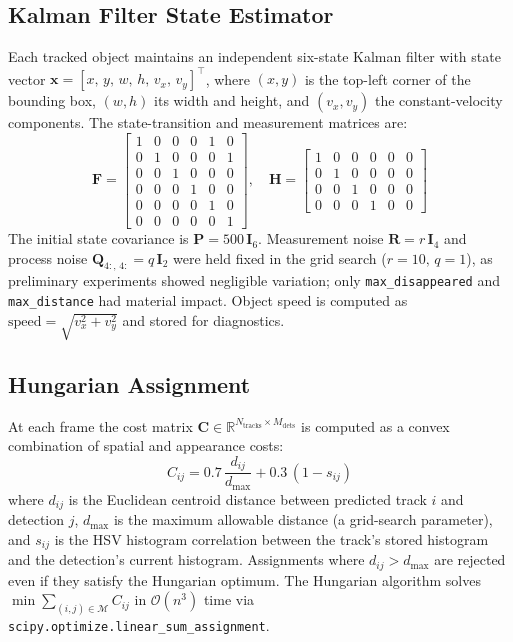 \documentclass[10pt, conference, compsocconf]{IEEEtran}
\begin{document}
\subsection{Kalman Filter State Estimator}
Each tracked object maintains an independent six-state Kalman
filter with state vector
$\mathbf{x} = [x,\, y,\, w,\, h,\, v_x,\, v_y]^\top$,
where $(x,y)$ is the top-left corner of the bounding box,
$(w,h)$ its width and height, and $(v_x, v_y)$ the constant-velocity
components. The state-transition and measurement matrices are:
\begin{equation}
  \mathbf{F} =
  \begin{bmatrix}
    1 & 0 & 0 & 0 & 1 & 0 \\
    0 & 1 & 0 & 0 & 0 & 1 \\
    0 & 0 & 1 & 0 & 0 & 0 \\
    0 & 0 & 0 & 1 & 0 & 0 \\
    0 & 0 & 0 & 0 & 1 & 0 \\
    0 & 0 & 0 & 0 & 0 & 1
  \end{bmatrix},\quad
  \mathbf{H} =
  \begin{bmatrix}
    1 & 0 & 0 & 0 & 0 & 0 \\
    0 & 1 & 0 & 0 & 0 & 0 \\
    0 & 0 & 1 & 0 & 0 & 0 \\
    0 & 0 & 0 & 1 & 0 & 0
  \end{bmatrix}
\end{equation}
The initial state covariance is $\mathbf{P} = 500\,\mathbf{I}_6$.
Measurement noise $\mathbf{R} = r\,\mathbf{I}_4$ and process noise
$\mathbf{Q}_{4:,\,4:} = q\,\mathbf{I}_2$ were held fixed in the grid
search ($r=10,\,q=1$), as preliminary experiments showed negligible
variation; only \texttt{max\_disappeared} and \texttt{max\_distance}
had material impact. Object speed is computed as
$\text{speed} = \sqrt{v_x^2 + v_y^2}$ and stored for diagnostics.

\subsection{Hungarian Assignment}
At each frame the cost matrix
$\mathbf{C} \in \mathbb{R}^{N_\text{tracks}\times M_\text{dets}}$
is computed as a convex combination of spatial and appearance costs:
\begin{equation}
  C_{ij} = 0.7\,\frac{d_{ij}}{d_\text{max}} + 0.3\,(1 - s_{ij})
  \label{eq:cost}
\end{equation}
where $d_{ij}$ is the Euclidean centroid distance between predicted
track $i$ and detection $j$, $d_\text{max}$ is the maximum allowable
distance (a grid-search parameter), and $s_{ij}$ is the HSV
histogram correlation between the track's stored histogram and the
detection's current histogram. Assignments where
$d_{ij} > d_\text{max}$ are rejected even if they satisfy the
Hungarian optimum. The Hungarian algorithm
\cite{kuhn1955} solves $\min \sum_{(i,j)\in\mathcal{M}} C_{ij}$
in $\mathcal{O}(n^3)$ time via \texttt{scipy.optimize.linear\_sum\_assignment}.
\end{document}
